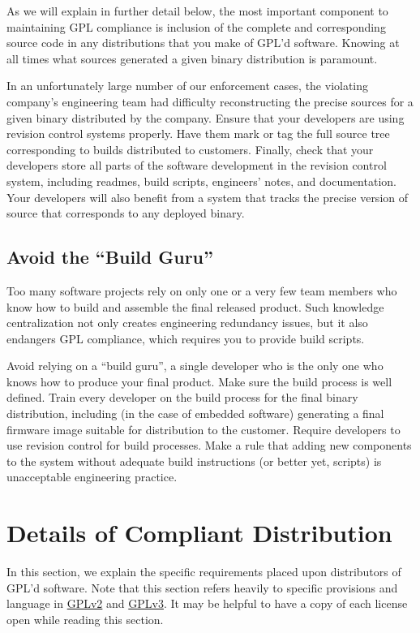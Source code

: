 As we will explain in further detail below, the most important component
to maintaining GPL compliance is inclusion of the complete and
corresponding source code in any distributions that you make of GPL'd
software.  Knowing at all times what sources generated a given binary
distribution is paramount.

In an unfortunately large number of our enforcement cases, the violating
company's engineering team had difficulty reconstructing the precise
sources for a given binary distributed by the company.  Ensure that your
developers are using revision control systems properly.  Have them mark or
tag the full source tree corresponding to builds distributed to customers.
Finally, check that your developers store all parts of the software
development in the revision control system, including {\sc readme}s, build
scripts, engineers' notes, and documentation.  Your developers will also
benefit from a system that tracks the precise version of source that
corresponds to any deployed binary.

\section{Avoid the ``Build Guru''}

Too many software projects rely on only one or a very few team members who
know how to build and assemble the final released product.  Such knowledge
centralization not only creates engineering redundancy issues, but it also
endangers GPL compliance, which requires you to provide build scripts.

Avoid relying on a ``build guru'', a single developer who is the only one
who knows how to produce your final product. Make sure the build process
is well defined.  Train every developer on the build process for the final
binary distribution, including (in the case of embedded software)
generating a final firmware image suitable for distribution to the
customer.  Require developers to use revision control for build processes.
Make a rule that adding new components to the system without adequate
build instructions (or better yet, scripts) is unacceptable engineering
practice.

\chapter{Details of Compliant Distribution}

In this section, we explain the specific requirements placed upon
distributors of GPL'd software.  Note that this section refers heavily to
specific provisions and language in
\href{http://www.gnu.org/licenses/old-licenses/gpl-2.0.html#section3}{GPLv2}
and \href{http://www.fsf.org/licensing/licenses/gpl.html#section6}{GPLv3}.
It may be helpful to have a copy of each license open while reading this
section.

